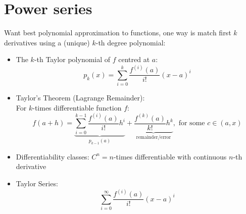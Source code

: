 \section{Power series}
Want best polynomial approximation to functions, one way is match first $k$ derivatives using a (unique) $k$-th degree polynomial:
\begin{itemize}
      \item The $k$-th Taylor polynomial of $f$ centred at $a$:
            \[p_k(x) = \sum_{i=0}^{k}\frac{f^{(i)}(a)}{i!} (x-a)^i\]
      \item Taylor's Theorem (Lagrange Remainder): \\
            For $k$-times differentiable function $f$: \[f(a+h) = \underbrace{\sum_{i=0}^{k-1} \frac{f^{(i)}(a)}{i!}h^i}_{p_{k-1}(a)} + \underbrace{\frac{f^{(k)}(a)}{k!}h^k}_{\text{remainder/error}}, \text{ for some } c \in (a,x)\]
      \item Differentiability classes: $C^n = n$-times differentiable with continuous $n$-th derivative
      \item Taylor Series: \[\sum_{i=0}^{\infty}\frac{f^{(i)}(a)}{i!} (x-a)^i\]
\end{itemize}

